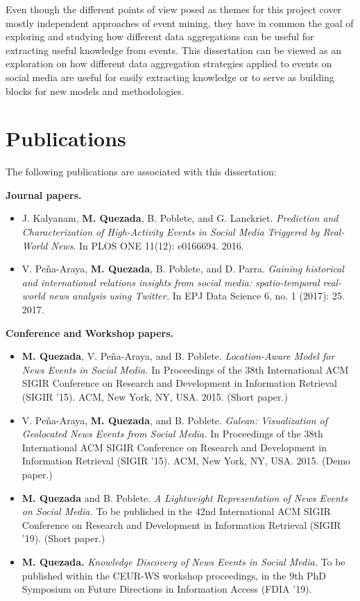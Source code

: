 Even though the different points of view posed as themes for this project cover
mostly independent approaches of event mining, they have in common the goal of
exploring and studying how different data aggregations can be useful for
extracting useful knowledge from events. 
%
This dissertation can be viewed as an exploration on how different data
aggregation strategies applied to events on social media are useful for easily
extracting knowledge or to serve as building blocks for new models and
methodologies.




\section*{Publications} 

The following publications are associated with this dissertation:

{\bf Journal papers.}
\begin{itemize}
    \item J. Kalyanam, {\bf M. Quezada}, B. Poblete, and G. Lanckriet. {\em
     Prediction and Characterization of High-Activity Events in Social Media
     Triggered by Real-World News}. In PLOS ONE 11(12): e0166694. 2016.

    \item V. Peña-Araya, {\bf M. Quezada}, B. Poblete, and D. Parra. {\em
    Gaining historical and international relations insights from social media:
    spatio-temporal real-world news analysis using Twitter.} In EPJ Data Science
    6, no. 1 (2017): 25. 2017.
\end{itemize}


{\bf Conference and Workshop papers.}

\begin{itemize}
    \item {\bf M. Quezada}, V. Peña-Araya, and B. Poblete. {\em Location-Aware
    Model for News Events in Social Media.} In Proceedings of the 38th
    International ACM SIGIR Conference on Research and Development in
    Information Retrieval (SIGIR '15). ACM, New York, NY, USA. 2015.
    (Short paper.)

    \item V. Peña-Araya, {\bf M. Quezada}, and B. Poblete. {\em Galean:
    Visualization of Geolocated News Events from Social Media.} In Proceedings
    of the 38th International ACM SIGIR Conference on Research and Development
    in Information Retrieval (SIGIR '15). ACM, New York, NY, USA. 2015.
    (Demo paper.)

    \item {\bf M. Quezada} and B. Poblete. {\em A Lightweight Representation of
    News Events on Social Media.} To be published in the 42nd International ACM SIGIR
    Conference on Research and Development in Information Retrieval (SIGIR '19).
    (Short paper.)

    \item {\bf M. Quezada.} {\em Knowledge Discovery of News Events in Social
    Media.} To be published within the CEUR-WS workshop proceedings, in the 9th
    PhD Symposium on Future Directions in Information Access (FDIA '19). 

\end{itemize}


